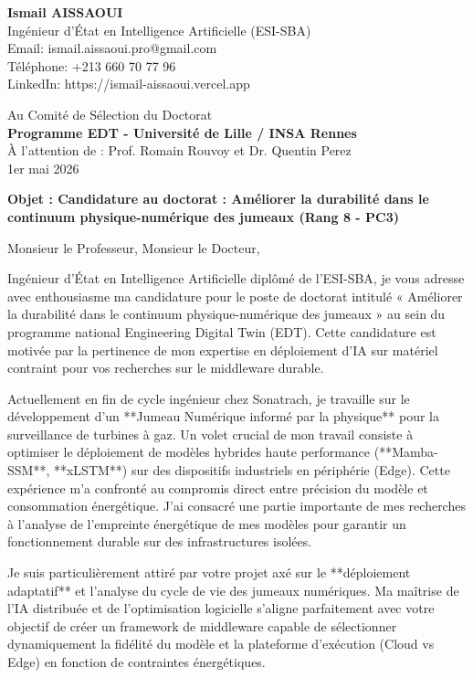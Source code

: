\documentclass[11pt,a4paper]{article}
\begin{document}
\noindent \textbf{Ismail AISSAOUI} \\
Ingénieur d'État en Intelligence Artificielle (ESI-SBA) \\
Email: ismail.aissaoui.pro@gmail.com \\
Téléphone: +213 660 70 77 96 \\
LinkedIn: https://ismail-aissaoui.vercel.app

\bigskip

\begin{flushright}
    Au Comité de Sélection du Doctorat \\
    \textbf{Programme EDT - Université de Lille / INSA Rennes} \\
    À l'attention de : Prof. Romain Rouvoy et Dr. Quentin Perez \\
    \medskip
    1er mai 2026
\end{flushright}

\bigskip

\noindent \textbf{Objet : Candidature au doctorat : Améliorer la durabilité dans le continuum physique-numérique des jumeaux (Rang 8 - PC3)}

\bigskip

Monsieur le Professeur, Monsieur le Docteur,

Ingénieur d'État en Intelligence Artificielle diplômé de l'ESI-SBA, je vous adresse avec enthousiasme ma candidature pour le poste de doctorat intitulé « Améliorer la durabilité dans le continuum physique-numérique des jumeaux » au sein du programme national Engineering Digital Twin (EDT). Cette candidature est motivée par la pertinence de mon expertise en déploiement d'IA sur matériel contraint pour vos recherches sur le middleware durable.

Actuellement en fin de cycle ingénieur chez Sonatrach, je travaille sur le développement d'un **Jumeau Numérique informé par la physique** pour la surveillance de turbines à gaz. Un volet crucial de mon travail consiste à optimiser le déploiement de modèles hybrides haute performance (**Mamba-SSM**, **xLSTM**) sur des dispositifs industriels en périphérie (Edge). Cette expérience m'a confronté au compromis direct entre précision du modèle et consommation énergétique. J'ai consacré une partie importante de mes recherches à l'analyse de l'empreinte énergétique de mes modèles pour garantir un fonctionnement durable sur des infrastructures isolées.

Je suis particulièrement attiré par votre projet axé sur le **déploiement adaptatif** et l'analyse du cycle de vie des jumeaux numériques. Ma maîtrise de l'IA distribuée et de l'optimisation logicielle s'aligne parfaitement avec votre objectif de créer un framework de middleware capable de sélectionner dynamiquement la fidélité du modèle et la plateforme d'exécution (Cloud vs Edge) en fonction de contraintes énergétiques.
\end{document}
